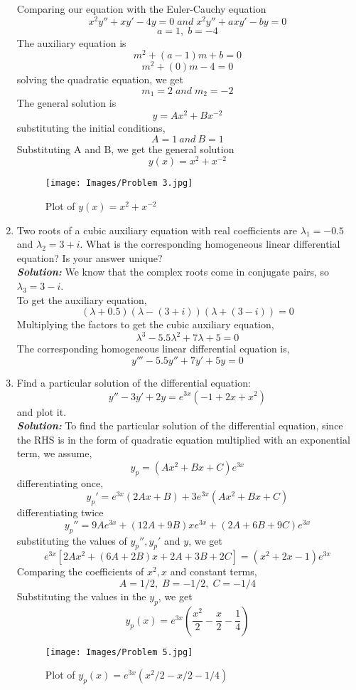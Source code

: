 \documentclass[]{book}
\theoremstyle{definition}
\begin{document}
\begin{enumerate}
Comparing our equation with the Euler-Cauchy equation
\[
x^2{y}'' + x{y}' - 4y = 0 \;and\; x^2{y}'' + ax{y}' - by = 0
\]
\[
a = 1,\;b = -4
\]
The auxiliary equation is
\[
m^2 + (a-1)m + b = 0
\]
\[
m^2 + (0)m - 4 = 0
\]
solving the quadratic equation, we get 
\[m_1 = 2\;and\;m_2 = -2\]
The general solution is
\[
y = Ax^{2} + Bx^{-2}
\]
substituting the initial conditions, 
\[
A = 1\:and\:B = 1
\]
Substituting A and B, we get the general solution
\[
y(x) = x^{2} + x^{-2}
\]
\begin{figure}[htbp]
    \centering
    \texttt{[image: Images/Problem 3.jpg]}
    \caption{Plot of $y(x) = x^{2} + x^{-2}$}
\end{figure}
\pagebreak

\item
{Two roots of a cubic auxiliary equation with real coefficients are $\lambda_1 = -0.5$ and $\lambda_2 = 3 + i$. What is the corresponding homogeneous linear differential equation? Is your answer unique?}\\

\emph{\textbf{Solution:}}
We know that the complex roots come in conjugate pairs, so $\lambda_3 = 3 - i$.\\
To get the auxiliary equation,
\[
(\lambda + 0.5)(\lambda - (3 + i))(\lambda + (3 - i)) = 0
\]
Multiplying the factors to get the cubic auxiliary equation,
\[
\lambda^3 - 5.5\lambda^2 + 7\lambda + 5 = 0
\]
The corresponding homogeneous linear differential equation is,
\[
{y}''' - 5.5{y}'' + 7{y}' + 5{y} = 0
\]

\item 
Find a particular solution of the differential equation:
\[ y'' - 3y' + 2y = e^{3x}(-1 + 2x + x^2) \]
and plot it.\\

\emph{\textbf{Solution:}}
To find the particular solution of the differential equation, since the RHS is in the form of quadratic equation multiplied with an exponential term, we assume,
\[
y_p = (Ax^2 + Bx + C)e^{3x}
\]
differentiating once,
\[
{y_p}' = e^{3x}(2Ax + B) + 3e^{3x}(Ax^2 + Bx + C)
\]
differentiating twice
\[
{y_p}'' = 9Ae^{3x} + (12A + 9B)xe^{3x} + (2A + 6B + 9C)e^{3x} 
\]
substituting the values of ${y_p}'',{y_p}'$ and ${y}$, we get
\[
e^{3x}[2Ax^2 + (6A + 2B)x + 2A + 3B + 2C] = (x^2 + 2x - 1)e^{3x}
\]
Comparing the coefficients of $x^2,x$ and constant terms,
\[
A = 1/2,\;B = -1/2,\;C = -1/4
\]
Substituting the values in the ${y_p}$, we get
\[
{y_p}(x) = e^{3x}(\frac{x^2}{2} -\frac{x}{2} -\frac{1}{4})
\]
\begin{figure}[htbp]
    \centering
    \texttt{[image: Images/Problem 5.jpg]}
    \caption{Plot of $y_p(x) = e^{3x}(x^2/2 - x/2 - 1/4)$}
\end{figure}


\end{enumerate}
\end{document}
